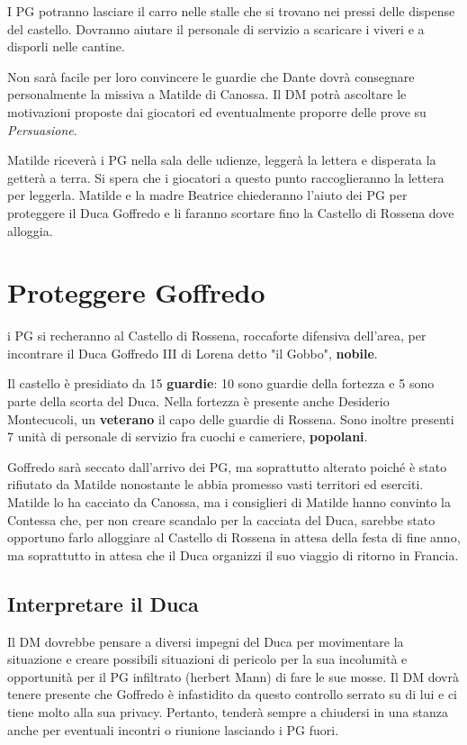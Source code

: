 \documentclass[letterpaper,twocolumn,openany,nodeprecatedcode]{dndbook}
\begin{document}
I PG potranno lasciare il carro nelle stalle che si trovano nei pressi delle dispense del castello. Dovranno aiutare il personale di servizio a scaricare i viveri e a disporli nelle cantine.

Non sarà facile per loro convincere le guardie che Dante dovrà consegnare personalmente la missiva a Matilde di Canossa. Il DM potrà ascoltare le motivazioni proposte dai giocatori ed eventualmente proporre delle prove su \textit{Persuasione}.

Matilde riceverà i PG nella sala delle udienze, leggerà la lettera e disperata la getterà a terra. Si spera che i giocatori a questo punto raccoglieranno la lettera per leggerla. Matilde e la madre Beatrice chiederanno l'aiuto dei PG per proteggere il Duca Goffredo e li faranno scortare fino la Castello di Rossena dove alloggia.






\chapter{Proteggere Goffredo}
 i PG si recheranno al Castello di Rossena, roccaforte difensiva dell'area, per incontrare il Duca Goffredo III di Lorena detto "il Gobbo", \textbf{nobile}.

Il castello è presidiato da 15 \textbf{guardie}: 10 sono guardie della fortezza e 5 sono parte della scorta del Duca. Nella fortezza è presente anche Desiderio Montecucoli, un \textbf{veterano} il capo delle guardie di Rossena. Sono inoltre presenti 7 unità di personale di servizio fra cuochi e cameriere, \textbf{popolani}.

Goffredo sarà seccato dall'arrivo dei PG, ma soprattutto alterato poiché è stato rifiutato da Matilde nonostante le abbia promesso vasti territori ed eserciti. Matilde lo ha cacciato da Canossa, ma i consiglieri di Matilde hanno convinto la Contessa che, per non creare scandalo per la cacciata del Duca, sarebbe stato opportuno farlo alloggiare al Castello di Rossena in attesa della festa di fine anno, ma soprattutto in attesa che il Duca organizzi il suo viaggio di ritorno in Francia.

\section{Interpretare il Duca}
Il DM dovrebbe pensare a diversi impegni del Duca per movimentare la situazione e creare possibili situazioni di pericolo per la sua incolumità e opportunità per il PG infiltrato (herbert Mann) di fare le sue mosse. Il DM dovrà tenere presente che Goffredo è infastidito da questo controllo serrato su di lui e ci tiene molto alla sua privacy. Pertanto, tenderà sempre a chiudersi in una stanza anche per eventuali incontri o riunione lasciando i PG fuori.
\end{document}
